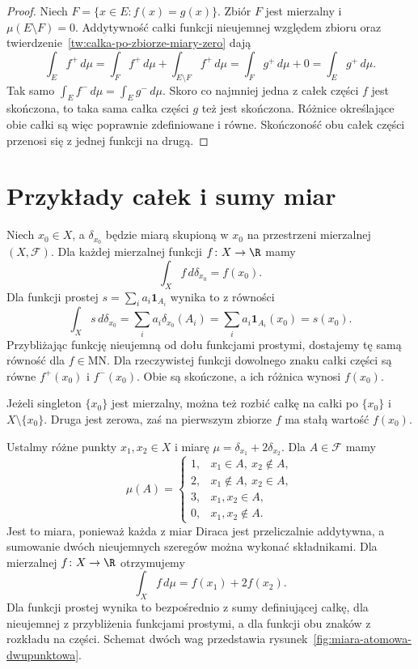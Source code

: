 \begin{proof}
Niech $F=\{x\in E:f(x)=g(x)\}$. Zbiór $F$ jest mierzalny
i $\mu(E\setminus F)=0$. Addytywność całki funkcji nieujemnej
względem zbioru oraz twierdzenie~\ref{tw:calka-po-zbiorze-miary-zero}
dają
\[
  \int_E f^+\,d\mu
  =\int_F f^+\,d\mu+\int_{E\setminus F}f^+\,d\mu
  =\int_F g^+\,d\mu+0
  =\int_E g^+\,d\mu.
\]
Tak samo $\int_E f^-\,d\mu=\int_E g^-\,d\mu$. Skoro co najmniej
jedna z całek części $f$ jest skończona, to taka sama całka części
$g$ też jest skończona. Różnice określające obie całki są więc
poprawnie zdefiniowane i równe. Skończoność obu całek części
przenosi się z jednej funkcji na drugą.
\end{proof}

\section{Przykłady całek i sumy miar}
\label{sec:przyklady-calki-i-sumy-miar}

\begin{przyklad}
\label{prz:calka-wzgledem-diraca}
Niech $x_0\in X$, a $\delta_{x_0}$ będzie miarą skupioną w $x_0$
na przestrzeni mierzalnej $(X,\mathcal F)$. Dla każdej mierzalnej
funkcji $f\colon X\to\R$ mamy
\begin{equation}
  \int_X f\,d\delta_{x_0}=f(x_0).
  \label{eq:calka-wzgledem-diraca}
\end{equation}
Dla funkcji prostej $s=\sum_i a_i\mathbf{1}_{A_i}$ wynika to z równości
\[
  \int_X s\,d\delta_{x_0}
  =\sum_i a_i\delta_{x_0}(A_i)
  =\sum_i a_i\mathbf{1}_{A_i}(x_0)=s(x_0).
\]
Przybliżając funkcję nieujemną od dołu funkcjami prostymi, dostajemy
tę samą równość dla $f\in\mathrm{MN}$. Dla rzeczywistej funkcji
dowolnego znaku całki części są równe $f^+(x_0)$ i $f^-(x_0)$.
Obie są skończone, a ich różnica wynosi $f(x_0)$.

Jeżeli singleton $\{x_0\}$ jest mierzalny, można też rozbić całkę na
całki po $\{x_0\}$ i $X\setminus\{x_0\}$. Druga jest zerowa, zaś
na pierwszym zbiorze $f$ ma stałą wartość $f(x_0)$.
\end{przyklad}

\begin{przyklad}
\label{prz:calka-miara-dwupunktowa}
Ustalmy różne punkty $x_1,x_2\in X$ i miarę
$\mu=\delta_{x_1}+2\delta_{x_2}$. Dla $A\in\mathcal F$ mamy
\[
  \mu(A)=
  \begin{cases}
    1, & x_1\in A,\ x_2\notin A,\\
    2, & x_1\notin A,\ x_2\in A,\\
    3, & x_1,x_2\in A,\\
    0, & x_1,x_2\notin A.
  \end{cases}
\]
Jest to miara, ponieważ każda z miar Diraca jest przeliczalnie
addytywna, a sumowanie dwóch nieujemnych szeregów można wykonać
składnikami. Dla mierzalnej $f\colon X\to\R$ otrzymujemy
\[
  \int_X f\,d\mu=f(x_1)+2f(x_2).
\]
Dla funkcji prostej wynika to bezpośrednio z sumy definiującej całkę,
dla nieujemnej z przybliżenia funkcjami prostymi, a dla funkcji obu
znaków z rozkładu na części. Schemat dwóch wag przedstawia
rysunek~\ref{fig:miara-atomowa-dwupunktowa}.
\end{przyklad}


